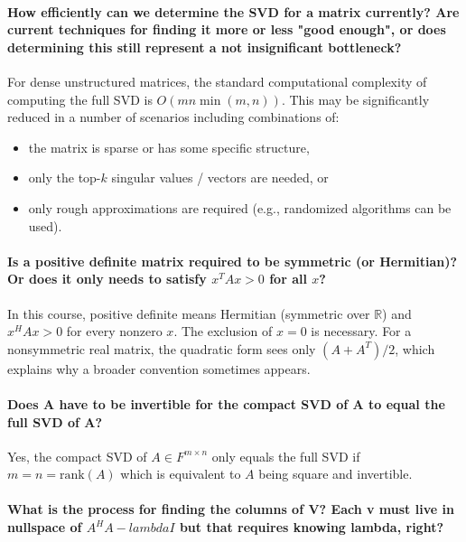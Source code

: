 \documentclass[10pt,english]{article}
\begin{document}
\paragraph{How efficiently can we determine the SVD for a matrix currently? Are current techniques for finding it more or less "good enough", or does determining this still represent a not insignificant bottleneck?}

For dense unstructured matrices, the standard computational complexity of computing the full SVD is $O(mn \min(m,n))$.
This may be significantly reduced in a number of scenarios including combinations of:
\begin{itemize}
\item the matrix is sparse or has some specific structure,
\item only the top-$k$ singular values / vectors are needed, or
\item only rough approximations are required (e.g., randomized algorithms can be used).
\end{itemize}


\paragraph{Is a positive definite matrix required to be symmetric (or Hermitian)? Or does it only needs to satisfy $x^T A x > 0$ for all $x$?}


In this course, positive definite means Hermitian (symmetric over $\mathbb{R}$) and $x^H A x>0$ for every nonzero $x$.
The exclusion of $x=0$ is necessary.
For a nonsymmetric real matrix, the quadratic form sees only $(A+A^T)/2$, which explains why a broader convention sometimes appears.


\paragraph{Does A have to be invertible for the compact SVD of A to equal the full SVD of A?}

Yes, the compact SVD of $A \in F^{m\times n}$ only equals the full SVD if $m=n=\text{rank}(A)$ which is equivalent to $A$ being square and invertible.

\paragraph{What is the process for finding the columns of V? Each v must live in nullspace of $A^H A - lambda I$ but that requires knowing lambda, right?}
\end{document}
